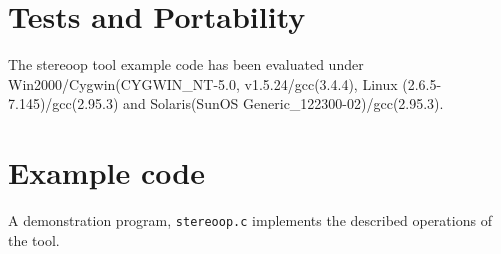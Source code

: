 %
%
%
%
%
%
%
%
%
%

\section{Tests and Portability}
The stereoop tool example code has been evaluated under
Win2000/Cygwin(CYGWIN\_NT-5.0, v1.5.24/gcc(3.4.4), Linux
(2.6.5-7.145)/gcc(2.95.3) and Solaris(SunOS
Generic\_122300-02)/gcc(2.95.3).

\section{Example code}

A demonstration program, {\tt stereoop.c} implements the described
operations of the tool.
